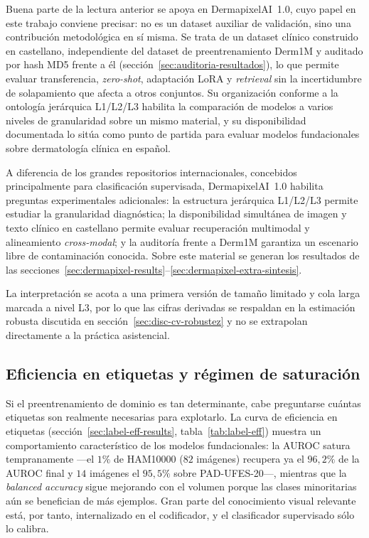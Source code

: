 Buena parte de la lectura anterior se apoya en DermapixelAI~1.0, cuyo
papel en este trabajo conviene precisar: no es un dataset auxiliar de
validación, sino una contribución metodológica en sí misma. Se trata de
un dataset clínico construido en castellano, independiente del dataset de
preentrenamiento Derm1M y auditado por hash MD5 frente a él
(sección~\ref{sec:auditoria-resultados}), lo que permite evaluar
transferencia, \emph{zero-shot}, adaptación LoRA y \emph{retrieval} sin la
incertidumbre de solapamiento que afecta a otros conjuntos. Su
organización conforme a la ontología jerárquica L1/L2/L3 habilita la
comparación de modelos a varios niveles de granularidad sobre un mismo
material, y su disponibilidad documentada lo sitúa como punto de partida
para evaluar modelos fundacionales sobre dermatología clínica en español.

A diferencia de los grandes repositorios internacionales, concebidos
principalmente para clasificación supervisada, DermapixelAI~1.0 habilita
preguntas experimentales adicionales: la estructura jerárquica L1/L2/L3
permite estudiar la granularidad diagnóstica; la disponibilidad
simultánea de imagen y texto clínico en castellano permite evaluar
recuperación multimodal y alineamiento \emph{cross-modal}; y la auditoría
frente a Derm1M garantiza un escenario libre de contaminación conocida.
Sobre este material se generan los resultados de las
secciones~\ref{sec:dermapixel-results}--\ref{sec:dermapixel-extra-sintesis}.

La interpretación se acota a una primera versión de tamaño limitado y
cola larga marcada a nivel L3, por lo que las cifras derivadas se
respaldan en la estimación robusta discutida en
sección~\ref{sec:disc-cv-robustez} y no se extrapolan directamente a la
práctica asistencial.

\subsection{Eficiencia en etiquetas y régimen de saturación}
\label{sec:disc-eficiencia}

Si el preentrenamiento de dominio es tan determinante, cabe
preguntarse cuántas etiquetas son realmente necesarias para
explotarlo. La curva de eficiencia en etiquetas
(sección~\ref{sec:label-eff-results}, tabla~\ref{tab:label-eff})
muestra un comportamiento característico de los modelos fundacionales:
la AUROC satura tempranamente ---el $1\%$ de HAM10000 ($82$ imágenes)
recupera ya el $96{,}2\%$ de la AUROC final y $14$ imágenes el
$95{,}5\%$ sobre PAD-UFES-20---, mientras que la \emph{balanced
accuracy} sigue mejorando con el volumen porque las clases minoritarias
aún se benefician de más ejemplos. Gran parte del conocimiento visual
relevante está, por tanto, internalizado en el codificador, y el
clasificador supervisado sólo lo calibra.


